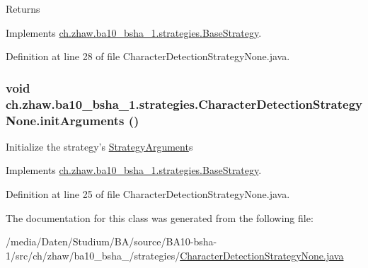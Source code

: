 \begin{DoxyReturn}{Returns}

\end{DoxyReturn}


Implements \hyperlink{classch_1_1zhaw_1_1ba10__bsha__1_1_1strategies_1_1BaseStrategy_aa0ebed55eed45409bad13d43a0058780}{ch.zhaw.ba10\_\-bsha\_\-1.strategies.BaseStrategy}.

Definition at line 28 of file CharacterDetectionStrategyNone.java.\hypertarget{classch_1_1zhaw_1_1ba10__bsha__1_1_1strategies_1_1CharacterDetectionStrategyNone_af7c760085a5347e359b83c02eb23af27}{
\subsubsection[{initArguments}]{\setlength{\rightskip}{0pt plus 5cm}void ch.zhaw.ba10\_\-bsha\_\-1.strategies.CharacterDetectionStrategyNone.initArguments ()}}
\label{classch_1_1zhaw_1_1ba10__bsha__1_1_1strategies_1_1CharacterDetectionStrategyNone_af7c760085a5347e359b83c02eb23af27}
Initialize the strategy's \hyperlink{classch_1_1zhaw_1_1ba10__bsha__1_1_1StrategyArgument}{StrategyArgument}s 

Implements \hyperlink{classch_1_1zhaw_1_1ba10__bsha__1_1_1strategies_1_1BaseStrategy_a0496e8fd0099a5f0f7765322d7e752a9}{ch.zhaw.ba10\_\-bsha\_\-1.strategies.BaseStrategy}.

Definition at line 25 of file CharacterDetectionStrategyNone.java.

The documentation for this class was generated from the following file:\begin{DoxyCompactItemize}
\item 
/media/Daten/Studium/BA/source/BA10-\/bsha-\/1/src/ch/zhaw/ba10\_\-bsha\_/strategies/\hyperlink{CharacterDetectionStrategyNone_8java}{CharacterDetectionStrategyNone.java}\end{DoxyCompactItemize}
